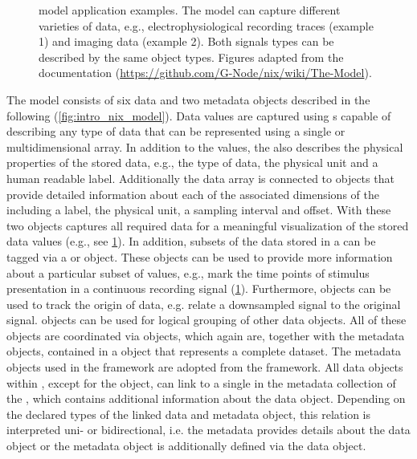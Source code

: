 \begin{figure}[hbt]
 \centering
 \scalebox{0.5}{
 }
 \caption[ model application examples]{ model application examples. The model can capture different varieties of data, e.g., electrophysiological recording traces (example 1) and imaging data (example 2). Both signals types can be described by the same  object types. Figures adapted from  the documentation (\url{https://github.com/G-Node/nix/wiki/The-Model}).}
 \label{fig:intro_nix_examples}
\end{figure}

The  model consists of six data and two metadata objects described in the following (\cref{fig:intro_nix_model}).
Data values are captured using s capable of describing any type of data that can be represented using a single or multidimensional array. In addition to the values, the  also describes the physical properties of the stored data, e.g., the type of data, the physical unit and a human readable label. Additionally the data array is connected to  objects that provide detailed information about each of the associated dimensions of the  including a label, the physical unit, a sampling interval and offset. With these two objects  captures all required data for a meaningful visualization of the stored data values (e.g., see \cref{fig:intro_nix_examples}). In addition, subsets of the data stored in a  can be tagged via a  or  object. These objects can be used to provide more information about a particular subset of values, e.g., mark the time points of stimulus presentation in a continuous recording signal (\cref{fig:intro_nix_examples}). Furthermore,  objects can be used to track the origin of data, e.g. relate a downsampled signal to the original signal.  objects can be used for logical grouping of other  data objects. All of these objects are coordinated via  objects, which again are, together with the metadata objects, contained in a   object that represents a complete dataset.
The metadata objects used in the  framework are adopted from the  framework. All data objects within , except for the  object, can link to a single  in the metadata collection of the  , which contains additional information about the data object. Depending on the declared types of the linked data and metadata object, this relation is interpreted uni- or bidirectional, i.e. the metadata  provides details about the data object or the metadata object is additionally defined via the data object.


